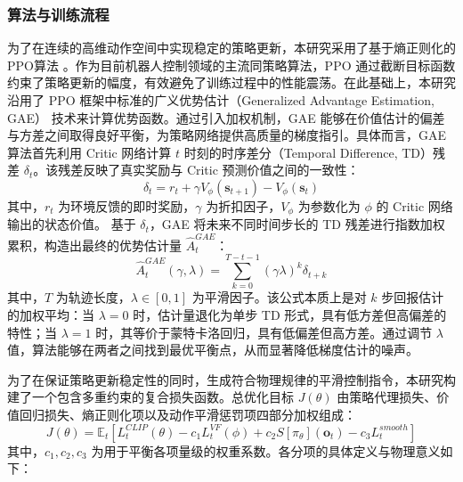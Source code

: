 \subsubsection{算法与训练流程}
为了在连续的高维动作空间中实现稳定的策略更新，本研究采用了基于熵正则化的PPO算法 \cite{schulman2017proximalpolicyoptimizationalgorithms}。作为目前机器人控制领域的主流同策略算法，PPO 通过截断目标函数约束了策略更新的幅度，有效避免了训练过程中的性能震荡。在此基础上，本研究沿用了 PPO 框架中标准的广义优势估计（Generalized Advantage Estimation, GAE）\cite{schulman2018highdimensionalcontinuouscontrolusing} 技术来计算优势函数。通过引入加权机制，GAE 能够在价值估计的偏差与方差之间取得良好平衡，为策略网络提供高质量的梯度指引。具体而言，GAE算法首先利用 Critic 网络计算 $t$ 时刻的时序差分（Temporal Difference, TD）残差 $\delta_t$。该残差反映了真实奖励与 Critic 预测价值之间的一致性：
\begin{equation}
    \delta_t = r_t + \gamma V_\phi(\mathbf{s}_{t+1}) - V_\phi(\mathbf{s}_t)
\end{equation}
其中，$r_t$ 为环境反馈的即时奖励，$\gamma$ 为折扣因子，$V_\phi$ 为参数化为 $\phi$ 的 Critic 网络输出的状态价值。
基于 $\delta_t$，GAE 将未来不同时间步长的 TD 残差进行指数加权累积，构造出最终的优势估计量 $\hat{A}_t^{GAE}$：
\begin{equation} \label{eq:3-14}
    \hat{A}_t^{GAE}(\gamma, \lambda) = \sum_{k=0}^{T-t-1} (\gamma \lambda)^k \delta_{t+k}
\end{equation}
其中，$T$ 为轨迹长度，$\lambda \in [0, 1]$ 为平滑因子。该公式本质上是对 $k$ 步回报估计的加权平均：当 $\lambda=0$ 时，估计量退化为单步 TD 形式，具有低方差但高偏差的特性；当 $\lambda=1$ 时，其等价于蒙特卡洛回归，具有低偏差但高方差。通过调节 $\lambda$ 值，算法能够在两者之间找到最优平衡点，从而显著降低梯度估计的噪声。

为了在保证策略更新稳定性的同时，生成符合物理规律的平滑控制指令，本研究构建了一个包含多重约束的复合损失函数。总优化目标 $J(\theta)$ 由策略代理损失、价值回归损失、熵正则化项以及动作平滑惩罚项四部分加权组成：
\begin{equation} \label{eq:3-15}
    J(\theta) = \mathbb{E}_t \left[ L_t^{CLIP}(\theta) - c_1 L_t^{VF}(\phi) + c_2 S[\pi_\theta](\mathbf{o}_t) - c_3 L_t^{smooth} \right]
\end{equation}
其中，$c_1, c_2, c_3$ 为用于平衡各项量级的权重系数。各分项的具体定义与物理意义如下：

